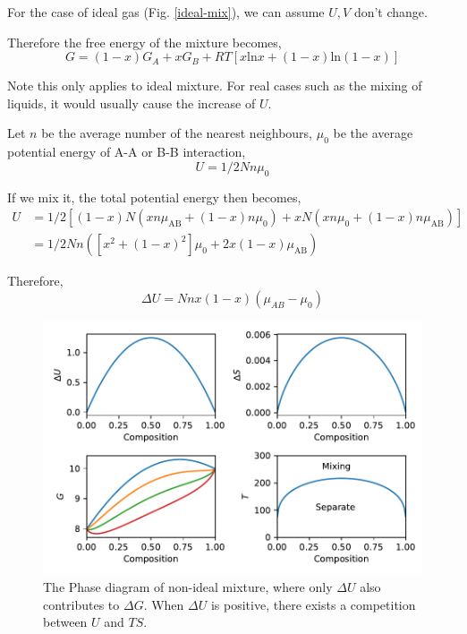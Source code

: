 For the case of ideal gas (Fig. \ref{ideal-mix}), we can assume $U,V$ don't change.

Therefore the free energy of the mixture becomes,
\begin{equation}
G = (1-x)G_A + xG_B + RT[x\text{ln}x + (1-x)\text{ln}(1-x)]
\end{equation}

Note this only applies to ideal mixture. For real cases such as the mixing of liquids, it would usually cause the increase of $U$.

Let $n$ be the average number of the nearest neighbours, $\mu_0$ be the average potential energy of A-A or B-B interaction,
\begin{equation}
U = 1/2Nn\mu_0   
\end{equation}

If we mix it, the total potential energy then becomes,
\begin{equation}
\begin{split}
U &= 1/2[(1-x)N(xn\mu_\text{AB} + (1-x)n\mu_0) + xN(xn\mu_0 + (1-x)n\mu_\text{AB})] \\
  &= 1/2Nn([x^2+(1-x)^2]\mu_0 + 2x(1-x)\mu_\text{AB})
\end{split}
\end{equation}

Therefore,
\begin{equation}
\Delta{U} = Nnx(1-x)(\mu_{AB}-\mu_0)
\end{equation}

\begin{figure}[h]
\centering
\includegraphics[width=12cm]{imgs/NonIdeal-Mixture.pdf}
\caption{The Phase diagram of non-ideal mixture, where only $\Delta{U}$ also contributes to $\Delta{G}$. When $\Delta{U}$ is positive, there exists 
a competition between $U$ and $TS$.}
\label{fig-non-ideal}
\end{figure}


